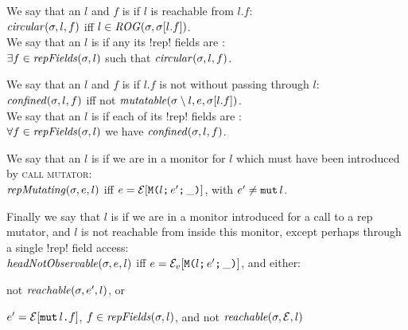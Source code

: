 \noindent We say that an $l$ and $f$ is \CR if $l$ is reachable from $l.f$:\\
\indent $\mathit{circular}(\sigma, l, f)$ iff $l \in \mathit{ROG}(\sigma, \sigma[l.f])$.\\
\noindent We say that an $l$ is \RCR if any its \Q!rep! fields are \CR:\\
\indent $\exists f \in \mathit{repFields}(\sigma,l)$ such that $\mathit{circular}(\sigma, l, f)$.
\LS

\noindent We say that an $l$ and $f$ is \CN if $l.f$ is not \muty without passing through $l$:\\
\indent $\mathit{confined}(\sigma, l, f)$ iff not $\mathit{mutatable}(\sigma\setminus l, e, \sigma[l.f])$.\\
\noindent We say that an $l$ is \RCN if each of its \Q!rep! fields are \CN:\\
\indent $\forall f \in \mathit{repFields}(\sigma,l)$ we have $\mathit{confined}(\sigma, l, f)$.
\LS
%

\noindent We say that an $l$ is \RM if we are in a monitor for $l$ which must have been introduced by \textsc{call mutator}:\\
\indent $\mathit{repMutating}(\sigma, e, l)$ iff $e = \mathcal{E}[\texttt{M}\texttt{(}{}l\texttt{;}\,e'\texttt{;}\,\_\texttt{)}]$, with $e' \neq \texttt{mut}\,l$.
\LS 

\noindent Finally we say that $l$ is \HNO if we are in a monitor introduced for a call to a rep mutator, and $l$ is not reachable from inside this monitor, except perhaps through a single \Q!rep! field access:\\
\indent $\mathit{headNotObservable}(\sigma, e, l)$ iff $e = \mathcal{E}_v{}[\texttt{M}\texttt{(}{}l\texttt{;}\,e'\texttt{;}\,\_\texttt{)}]$, and either:
\begin{iitemize}
\item not $\mathit{reachable}(\sigma, e', l)$, or\SS
\item $e' = \mathcal{E}[\texttt{mut}\,l\texttt{.} f]$, $f \in \mathit{repFields}(\sigma,l)$, and not $\mathit{reachable}(\sigma, \mathcal{E}, l)$
\end{iitemize}

